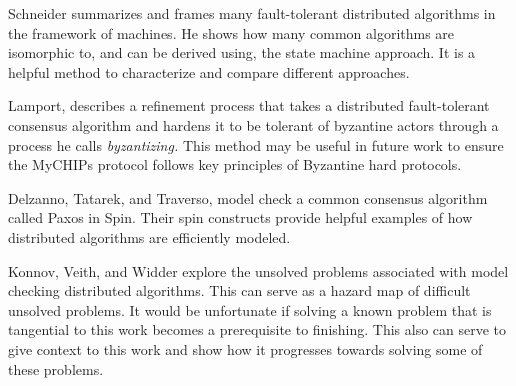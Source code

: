\documentclass[article, onecolumn, 12pt]{IEEEtran}
\begin{document}
 
 Schneider summarizes and frames many fault-tolerant distributed algorithms in the framework of  machines\cite{StateMachine}. He shows how many common algorithms are isomorphic to, and can be derived using, the state machine approach. It is a helpful method to characterize and compare different approaches.
 
 Lamport\cite{Lamport}, describes a refinement process that takes a distributed fault-tolerant consensus algorithm and hardens it to be tolerant of byzantine actors through a process he calls \emph{byzantizing.} This method may be useful in future work to ensure the MyCHIPs protocol follows key principles of Byzantine hard protocols.
 
 Delzanno, Tatarek, and Traverso, model check a common consensus algorithm called Paxos in Spin. Their spin constructs provide helpful examples of how distributed algorithms are efficiently modeled.\cite{Delzanno_2014}
 
 Konnov, Veith, and Widder explore the unsolved problems associated with model checking distributed algorithms. This can serve as a hazard map of difficult unsolved problems. It would be unfortunate if solving a known problem that is tangential to this work becomes a prerequisite to finishing. This also can serve to give context to this work and show how it progresses towards solving some of these problems.\cite{Konnov}



\end{document}
